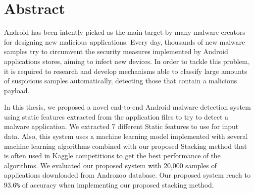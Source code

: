 \chapter*{Abstract}
\thispagestyle{empty}

Android has been intently picked as the main target by many malware creators for
designing new malicious applications. Every day, thousands of new malware samples
try to circumvent the security measures implemented by Android applications stores,
aiming to infect new devices. In order to tackle this problem, it is required to research and develop mechanisms able to classify large amounts of suspicious samples
automatically, detecting those that contain a malicious payload.

In this thesis, we proposed a novel end-to-end Android malware detection system using static features extracted from the application files to try to detect a malware application. We extracted 7 different Static features to use for input data. Also, this system uses a machine learning model implemented with several machine learning algorithms combined with our proposed Stacking method that is often used in Kaggle competitions to get the best performance of the algorithms. We evaluated our proposed system with 20,000 samples of applications downloaded from Androzoo \cite{androzoo} database. Our proposed system reach to 93.6\verb+%+ of accuracy when implementing our proposed stacking method.